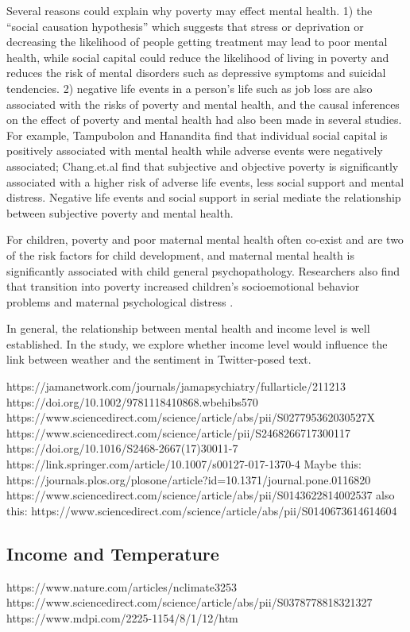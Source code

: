 \documentclass{article}
\begin{document}
 
Several reasons could explain why poverty may effect mental health. 1) the “social causation hypothesis” which suggests that stress or deprivation or decreasing the likelihood of people getting treatment may lead to poor mental health\citep{mills2015}, while social capital could reduce the likelihood of living in poverty and reduces the risk of mental disorders such as depressive symptoms and suicidal tendencies\citep{RN1291}. 2) negative life events in a person’s life such as job loss are also associated with the risks of poverty\citep{RN1293} and mental health\citep{TAMPUBOLON201420}, and the causal inferences on the effect of poverty and mental health had also been made in several studies. For example, Tampubolon and Hanandita\citep{TAMPUBOLON201420} find that individual social capital is positively associated with mental health while adverse events were negatively associated; Chang.et.al \citep{RN1291} find that subjective and objective poverty is significantly associated with a higher risk of adverse life events, less social support and mental distress. Negative life events and social support in serial mediate the relationship between subjective poverty and mental health.

For children, poverty and poor maternal mental health often co-exist and are two of the risk factors for child development\citep{LUND20111502}, and maternal mental health is significantly associated with child general psychopathology\citep{ RN1289}. Researchers also find that transition into poverty increased children’s socioemotional behavior problems and maternal psychological distress \citep{WICKHAM2017e141}.

In general, the relationship between mental health and income level is well established. In the study, we explore whether income level would influence the link between weather and the sentiment in Twitter-posed text.

https://jamanetwork.com/journals/jamapsychiatry/fullarticle/211213
https://doi.org/10.1002/9781118410868.wbehibs570
https://www.sciencedirect.com/science/article/abs/pii/S027795362030527X
https://www.sciencedirect.com/science/article/pii/S2468266717300117
https://doi.org/10.1016/S2468-2667(17)30011-7
https://link.springer.com/article/10.1007/s00127-017-1370-4
Maybe this: https://journals.plos.org/plosone/article?id=10.1371/journal.pone.0116820
https://www.sciencedirect.com/science/article/abs/pii/S0143622814002537
also this: https://www.sciencedirect.com/science/article/abs/pii/S0140673614614604

\subsection{Income and Temperature}
https://www.nature.com/articles/nclimate3253
https://www.sciencedirect.com/science/article/abs/pii/S0378778818321327
https://www.mdpi.com/2225-1154/8/1/12/htm
\end{document}
